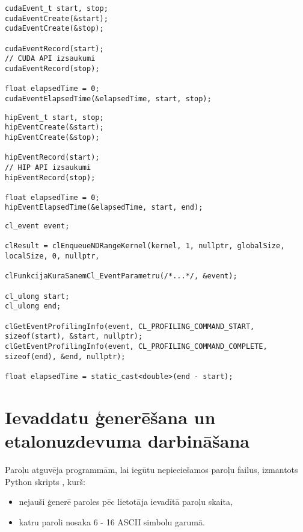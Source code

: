 \begin{lstlisting}[caption={CUDA laika mērīšanas piemērs},
    captionpos=b,
    label=lst:cuda_example]
cudaEvent_t start, stop;
cudaEventCreate(&start);
cudaEventCreate(&stop);

cudaEventRecord(start);
// CUDA API izsaukumi
cudaEventRecord(stop);

float elapsedTime = 0;
cudaEventElapsedTime(&elapsedTime, start, stop);
\end{lstlisting}

\begin{lstlisting}[caption={ROCm HIP laika mērīšanas piemērs},
    captionpos=b,
    label=lst:hip_example]
hipEvent_t start, stop;
hipEventCreate(&start);
hipEventCreate(&stop);

hipEventRecord(start);
// HIP API izsaukumi
hipEventRecord(stop);

float elapsedTime = 0;
hipEventElapsedTime(&elapsedTime, start, end);
\end{lstlisting}

\begin{lstlisting}[caption={OpenCL laika mērīšanas piemērs},
    captionpos=b,
    label=lst:cl_example]
cl_event event;

clResult = clEnqueueNDRangeKernel(kernel, 1, nullptr, globalSize, localSize, 0, nullptr,

clFunkcijaKuraSanemCl_EventParametru(/*...*/, &event);

cl_ulong start;
cl_ulong end;

clGetEventProfilingInfo(event, CL_PROFILING_COMMAND_START, sizeof(start), &start, nullptr);
clGetEventProfilingInfo(event, CL_PROFILING_COMMAND_COMPLETE, sizeof(end), &end, nullptr);

float elapsedTime = static_cast<double>(end - start);
\end{lstlisting}

\section{Ievaddatu ģenerēšana un etalonuzdevuma darbināšana}
Paroļu atguvēja programmām, lai iegūtu nepieciešamos paroļu failus, izmantots
Python skripts \cite{kursa-darbs}, kurš: 
\begin{itemize}
    \item nejauši ģenerē paroles pēc lietotāja ievadītā paroļu skaita,
    \item katru paroli nosaka 6 - 16 ASCII simbolu garumā.
\end{itemize}

